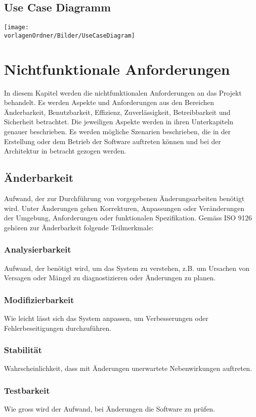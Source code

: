 \documentclass[
	ngerman,
	toc=listof, %
	toc=bibliography, %
	footnotes=multiple, %
	parskip=half, %
	numbers=noendperiod %
]{scrartcl}
\newcommand{\vorlagenOrdner}{../../99_Vorlagen} %
\begin{document}
	\subsection{Use Case Diagramm}
		\texttt{[image: \\vorlagenOrdner/Bilder/UseCaseDiagram]}

\section{Nichtfunktionale Anforderungen}
	In diesem Kapitel werden die nichtfunktionalen Anforderungen an das Projekt behandelt.
	Es werden Aspekte und Anforderungen aus den Bereichen Änderbarkeit, Benutzbarkeit, Effizienz, Zuverlässigkeit, Betreibbarkeit und Sicherheit betrachtet.
	Die jeweiligen Aspekte werden in ihren Unterkapiteln genauer beschrieben.
	Es werden mögliche Szenarien beschrieben, die in der Erstellung oder dem Betrieb der Software auftreten können und bei der Architektur in betracht gezogen werden.

	\subsection{Änderbarkeit}
		Aufwand, der zur Durchführung von vorgegebenen Änderungsarbeiten benötigt wird.
		Unter Änderungen gehen Korrekturen, Anpassungen oder Veränderungen der Umgebung, Anforderungen oder funktionalen Spezifikation.
		Gemäss ISO 9126 gehören zur Änderbarkeit folgende Teilmerkmale:
		
		\subsubsection{Analysierbarkeit}
			Aufwand, der benötigt wird, um das System zu verstehen, z.B. um Ursachen von Versagen oder Mängel zu diagnostizieren oder Änderungen zu planen.

		\subsubsection{Modifizierbarkeit}
			Wie leicht lässt sich das System anpassen, um Verbesserungen oder Fehlerbeseitigungen durchzuführen.

		\subsubsection{Stabilität}
			Wahrscheinlichkeit, dass mit Änderungen unerwartete Nebenwirkungen auftreten.

		\subsubsection{Testbarkeit}
			Wie gross wird der Aufwand, bei Änderungen die Software zu prüfen.
\end{document}
